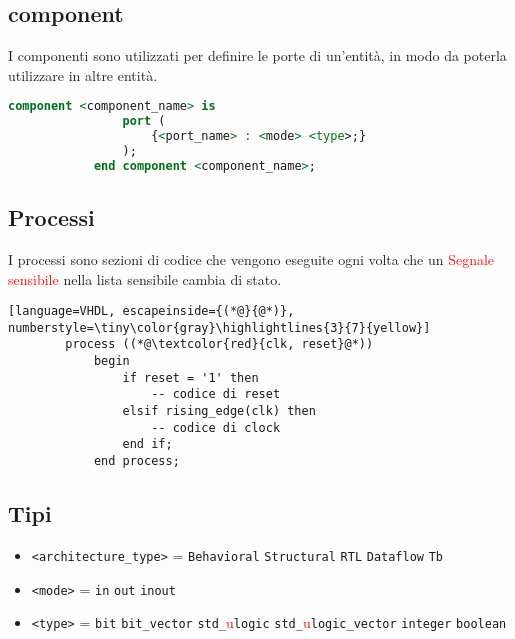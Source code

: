     \subsection{component}
        I componenti sono utilizzati per definire le porte di un'entità, in modo da poterla utilizzare in altre entità.
        \begin{lstlisting}[language=VHDL]
            component <component_name> is
                port (
                    {<port_name> : <mode> <type>;}
                );
            end component <component_name>;
        \end{lstlisting}


    \subsection{Processi}
        I processi sono sezioni di codice che vengono eseguite ogni volta che un \textcolor{red}{Segnale sensibile} nella lista sensibile cambia di stato.
        \begin{lstlisting}[language=VHDL, escapeinside={(*@}{@*)}, numberstyle=\tiny\color{gray}\highlightlines{3}{7}{yellow}]
        process ((*@\textcolor{red}{clk, reset}@*))
            begin
                if reset = '1' then
                    -- codice di reset
                elsif rising_edge(clk) then
                    -- codice di clock
                end if;
            end process;
        \end{lstlisting}


    \subsection{Tipi}
        \begin{itemize}
            \item \texttt{<architecture\_type>} = \texttt{Behavioral} \textbar{} \texttt{Structural} \textbar{} \texttt{RTL} \textbar{} \texttt{Dataflow} \textbar{} \texttt{Tb}
            \item \texttt{<mode>} = \texttt{in} \textbar{} \texttt{out} \textbar{} \texttt{inout}
            \item \texttt{<type>} = \texttt{bit} \textbar{} \texttt{bit\_vector} \textbar{} \texttt{std\_}\textcolor{red}{u}\texttt{logic} \textbar{} \texttt{std\_}\textcolor{red}{u}\texttt{logic\_vector} \textbar{} \texttt{integer} \textbar{} \texttt{boolean}
        \end{itemize}
        


